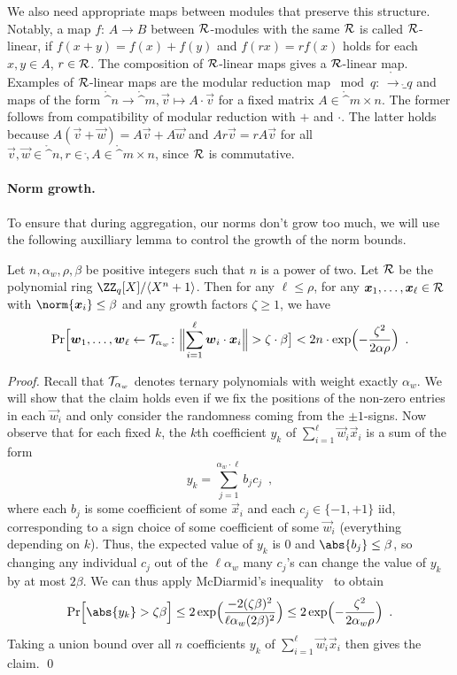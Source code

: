We also need appropriate maps between modules that preserve this structure. Notably, a map $f\colon\,A\to B$ between $\mathcal{R}$-modules with the same $\mathcal{R}$ is called $\mathcal{R}$-linear, if $f(x+y) = f(x) + f(y)$ and $f(rx) = rf(x)$ holds for each $x,y\in A$, $r\in\mathcal{R}$. The composition of $\mathcal{R}$-linear maps gives a $\mathcal{R}$-linear map.
Examples of $\mathcal{R}$-linear maps are the modular reduction map ${}\bmod q\colon\,\ring\to\ring_q$ and maps of the form $\ring^n \to \ring^m, \vec{v}\mapsto A\cdot \vec{v}$ for a fixed matrix $A\in\ring^{m\times n}$. The former follows from compatibility of modular reduction with $+$ and $\cdot$. The latter holds because $A(\vec{v}+\vec{w}) = A\vec{v} + A\vec{w}$ and $Ar\vec{v} = rA\vec{v}$ for all $\vec{v},\vec{w}\in\ring^n, r\in \ring, A\in\ring^{m\times n}$, since $\mathcal{R}$ is commutative.

\paragraph{Norm growth.}
To ensure that during aggregation, our norms don't grow too much, we will use the following auxilliary lemma to control the growth of the norm bounds.
\begin{lemma}\label{lem:normgrowth}
Let $n, \alpha_w, \rho, \beta$ be positive integers such that $n$ is a power of two.
Let $\mathcal{R}$ be the polynomial ring $\defringq$.
Then for any $\ell\leq \rho$, for any $\boldsymbol{x}_1,\ldots,\boldsymbol{x}_\ell\in \mathcal{R}$ with $\norm{\vec{x}_i}\leq \beta$ and any growth factors $\zeta \geq 1$, we have
\[
 \Pr\Bigl[\vec{w}_1,\ldots,\vec{w}_\ell \gets \tern_{\alpha_w}\colon \Bigl\|\smashoperator{\sum_{i=1}^{\ell}} \vec{w}_i\cdot \vec{x}_i\Bigr\| > \zeta\cdot \beta \bigr] < 2n\cdot \exp\Bigl(-\frac{\zeta^2}{2\alpha\rho}\Bigr)\enspace.
\]
\end{lemma}
\begin{proof}
Recall that $\mathcal{T}_{\alpha_w}$ denotes ternary polynomials with weight exactly $\alpha_w$. We will show that the claim holds even if we fix the positions of the non-zero entries in each $\vec{w}_i$ and only consider the randomness coming from the $\pm 1$-signs.
Now observe that for each fixed $k$, the $k$th coefficient $y_k$ of $\sum_{i=1}^{\ell} \vec{w}_i \vec{x}_i$ is a sum of the form
\[
 y_k = \sum_{j=1}^{\alpha_w\cdot \ell} b_j c_j\enspace,
\]
where each $b_j$ is some coefficient of some $\vec{x}_i$ and each $c_j\in\{-1,+1\}$ iid, corresponding to a sign choice of some coefficient of some $\vec{w}_i$ (everything depending on $k$).
Thus, the expected value of $y_k$ is 0 and $\abs{b_j}\leq \beta$, so changing any individual $c_j$ out of the $\ell\alpha_w$ many $c_j$'s can change the value of $y_k$ by at most $2\beta$.
We can thus apply McDiarmid's inequality~\cite{McDiarmid89} to obtain
\[
 \Pr\Bigl[\abs{y_k} > \zeta\beta\Bigr] \leq 2\exp\Bigl(\frac{-2(\zeta\beta)^2}{\ell\alpha_w(2\beta)^2}\Bigr) \leq 2\exp\Bigl(- \frac{\zeta^2}{2\alpha_w\rho} \Bigr)\enspace.
\]
Taking a union bound over all $n$ coefficients $y_k$ of $\sum_{i=1}^{\ell} \vec{w}_i \vec{x}_i$ then gives the claim.
\qed
\end{proof}

